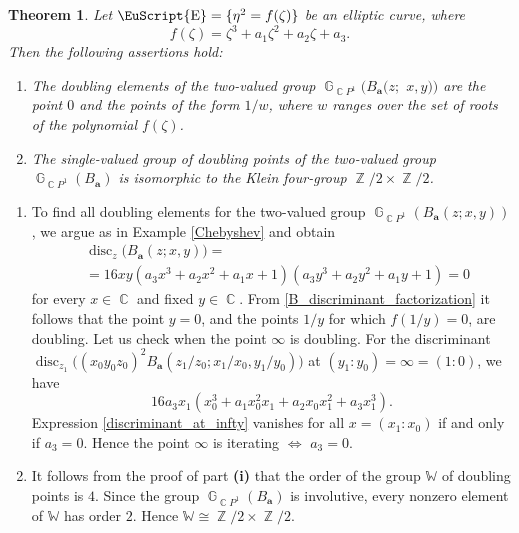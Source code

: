 \documentclass[14pt, dvipsnames]{extarticle}
\makeatletter
\theoremstyle{plain}
\newtheorem{theorem}{Theorem}
\theoremstyle{definition}
\theoremstyle{remark}
\renewenvironment{proof}[1][\proofname]{
  \par\pushQED{\qed}\normalfont
  \topsep6\p@\@plus6\p@\relax
  \trivlist\item[\hskip\labelsep\bfseries\itshape #1\@addpunct{.}]
}{\popQED\endtrivlist\@endpefalse}
\DeclareMathOperator{\disc}{\mathrm{disc}}
\DeclareMathOperator{\E}{\EuScript{E}}
\DeclareMathOperator{\G}{\mathbb{G}}
\DeclareMathOperator{\Z}{\mathbb{Z}}
\DeclareMathOperator{\Cc}{\mathbb{C}}
\makeatother
\begin{document}
\begin{theorem}\label{doubling_group_for_elliptic_curves}
Let $\E = \{\eta^2 = f(\zeta)\}$ be an elliptic curve, where
$$f(\zeta) = \zeta^3 + a_1\zeta^2 + a_2\zeta + a_3.$$
Then the following assertions hold:
 \begin{enumerate}[\bf (i)]
\item {The doubling elements of the two-valued group $\G_{\Cc\!P^1}(B_{\boldsymbol{a}}(z;$ $ x, y))$ are the point $0$ and the points of the form $1/w$, where $w$ ranges over the set of roots of the polynomial $f(\zeta)$.}   

\item The single-valued group of doubling points of the two-valued group $\G_{\Cc\!P^1}(B_{\boldsymbol{a}})$ is isomorphic to the Klein four-group $\Z/2\times \Z/2$.
 \end{enumerate}
\end{theorem}

\begin{proof}
\begin{enumerate}[\bf (i)]
\item To find all doubling elements for the two-valued group $\G_{\Cc\!P^1}(B_{\boldsymbol{a}}(z;x,y))$, we argue as in Example \ref{Chebyshev} and obtain
\begin{equation}\label{B_discriminant_factorization}
\begin{aligned}
&\disc_z\bigl(B_{\boldsymbol{a}}(z;x,y)\bigr)=\\
&=16xy(a_3x^3+a_2x^2+a_1x+1)(a_3y^3+a_2y^2+a_1y+1)=0
\end{aligned}
\end{equation}
for every \(x\in \Cc\) and fixed \(y\in \Cc\). From \eqref{B_discriminant_factorization} it follows that the point $y=0$, and the points $1/y$ for which $f(1/y)=0$, are doubling. Let us check when the point $\infty$ is doubling. For the discriminant
$\disc_{z_1}\bigl((x_0y_0z_0)^2B_{\boldsymbol{a}}(z_1/z_0; x_1/x_0, y_1/y_0)\bigr)$
at $(y_1:y_0) =\infty =  (1:0)$, we have
\begin{equation}\label{discriminant_at_infty}
16a_3x_1(x_0^3+a_1x_0^2x_1 + a_2x_0 x_1^2 + a_3 x_1^3).
\end{equation}
Expression \eqref{discriminant_at_infty} vanishes for all $x = (x_1:x_0)$ if and only if $a_3 = 0$. Hence the point $\infty$ is iterating $\Longleftrightarrow$ $a_3 = 0$.   

\item It follows from the proof of part {\bf (i)} that the order of the group $\mathbb{W}$ of doubling points is $4$. Since the group \(\G_{\Cc\!P^1}(B_{\boldsymbol{a}})\) is involutive, every nonzero element of $\mathbb{W}$ has order $2$. Hence $\mathbb{W}\cong \Z/2\times \Z/2$.
\end{enumerate}
\end{proof}
\end{document}
